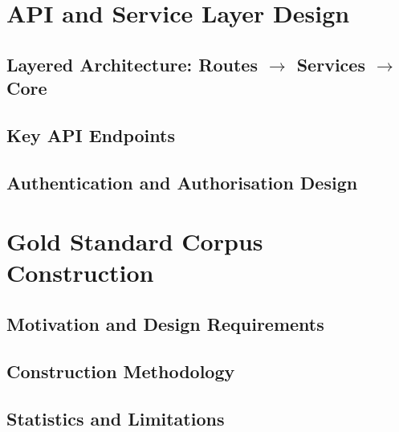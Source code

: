 \documentclass[12pt,a4paper]{report}
\begin{document}
\section{API and Service Layer Design}
\label{sec:api-design}

  \subsection{Layered Architecture: Routes \texorpdfstring{$\to$}{->} Services \texorpdfstring{$\to$}{->} Core}
  \label{subsec:layered-api}

  \subsection{Key API Endpoints}
  \label{subsec:key-endpoints}

  \subsection{Authentication and Authorisation Design}
  \label{subsec:auth-design}

\section{Gold Standard Corpus Construction}
\label{sec:corpus-construction}

  \subsection{Motivation and Design Requirements}
  \label{subsec:corpus-design}

  \subsection{Construction Methodology}
  \label{subsec:corpus-methodology}

  \subsection{Statistics and Limitations}
  \label{subsec:corpus-statistics}
\end{document}
